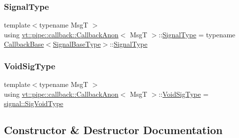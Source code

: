 \mbox{\label{structvt_1_1pipe_1_1callback_1_1_callback_anon_a710e9366e47c727549714e568b622f85}} 
\subsubsection{\texorpdfstring{Signal\+Type}{SignalType}}
{\footnotesize\ttfamily template$<$typename MsgT $>$ \\
using \hyperlink{structvt_1_1pipe_1_1callback_1_1_callback_anon}{vt\+::pipe\+::callback\+::\+Callback\+Anon}$<$ MsgT $>$\+::\hyperlink{structvt_1_1pipe_1_1callback_1_1_callback_anon_a710e9366e47c727549714e568b622f85}{Signal\+Type} =  typename \hyperlink{structvt_1_1pipe_1_1callback_1_1_callback_base}{Callback\+Base}$<$\hyperlink{structvt_1_1pipe_1_1callback_1_1_callback_anon_a84629a45a0c53a8804a4fa68b6b4aaa7}{Signal\+Base\+Type}$>$\+::\hyperlink{structvt_1_1pipe_1_1callback_1_1_callback_anon_a710e9366e47c727549714e568b622f85}{Signal\+Type}}

\mbox{\label{structvt_1_1pipe_1_1callback_1_1_callback_anon_a37f2e8be7b6c014a2a33232b678a05cc}} 
\subsubsection{\texorpdfstring{Void\+Sig\+Type}{VoidSigType}}
{\footnotesize\ttfamily template$<$typename MsgT $>$ \\
using \hyperlink{structvt_1_1pipe_1_1callback_1_1_callback_anon}{vt\+::pipe\+::callback\+::\+Callback\+Anon}$<$ MsgT $>$\+::\hyperlink{structvt_1_1pipe_1_1callback_1_1_callback_anon_a37f2e8be7b6c014a2a33232b678a05cc}{Void\+Sig\+Type} =  \hyperlink{namespacevt_1_1pipe_1_1signal_acbe257d1ae44f20fa9fd9b6ed3057caf}{signal\+::\+Sig\+Void\+Type}}



\subsection{Constructor \& Destructor Documentation}
\mbox{\label{structvt_1_1pipe_1_1callback_1_1_callback_anon_aaca363b861f00c073c7b73dbef6e01fd}} 
